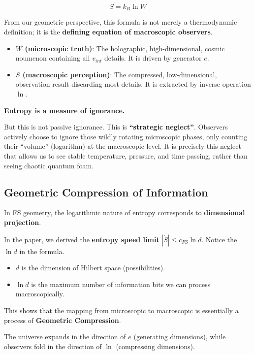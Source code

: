 \documentclass[11pt,a4paper,twoside]{book}
\begin{document}
$$S = k_B \ln W$$

From our geometric perspective, this formula is not merely a thermodynamic definition; it is the \textbf{defining equation of macroscopic observers}.

\begin{itemize}
\item \textbf{$W$ (microscopic truth)}: The holographic, high-dimensional, cosmic noumenon containing all $v_{int}$ details. It is driven by generator $e$.

\item \textbf{$S$ (macroscopic perception)}: The compressed, low-dimensional, observation result discarding most details. It is extracted by inverse operation $\ln$.
\end{itemize}

\textbf{Entropy is a measure of ignorance.}

But this is not passive ignorance. This is \textbf{``strategic neglect''}. Observers actively choose to ignore those wildly rotating microscopic phases, only counting their ``volume'' (logarithm) at the macroscopic level. It is precisely this neglect that allows us to see stable temperature, pressure, and time passing, rather than seeing chaotic quantum foam.

\subsection{Geometric Compression of Information}

In FS geometry, the logarithmic nature of entropy corresponds to \textbf{dimensional projection}.

In the paper, we derived the \textbf{entropy speed limit} $|\dot{S}| \le c_{FS} \ln d$. Notice the \textbf{$\ln d$} in the formula.

\begin{itemize}
\item $d$ is the dimension of Hilbert space (possibilities).

\item $\ln d$ is the maximum number of information bits we can process macroscopically.
\end{itemize}

This shows that the mapping from microscopic to macroscopic is essentially a process of \textbf{Geometric Compression}.

The universe expands in the direction of $e$ (generating dimensions), while observers fold in the direction of $\ln$ (compressing dimensions).
\end{document}
